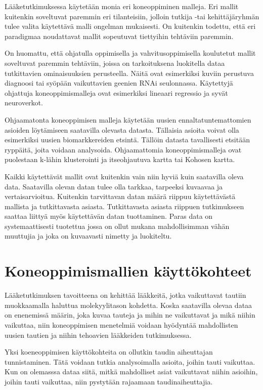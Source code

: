 \documentclass[finnish,twoside,censored,essay,sw-line]{HYthesisML}
\begin{document}
Lääketutkimuksessa käytetään monia eri koneoppiminen malleja. Eri mallit kuitenkin soveltuvat paremmin eri tilanteisiin,
jolloin tutkija -tai kehittäjäryhmän tulee valita käytettävä malli ongelman mukaisesti. On kuitenkin todettu, että
eri paradigmaa noudattavat mallit sopeutuvat tiettyihin tehtäviin paremmin.

On huomattu, että ohjatulla oppimisella
ja vahvitusoppimisella koulutetut mallit soveltuvat paremmin tehtäviin, joissa on tarkoituksena luokitella
dataa tutkittavien ominaisuuksien perusteella. Näitä ovat esimerkiksi kuviin perustuva diagnoosi tai syöpään
vaikuttavien geenien RNAi seulonnassa. Käytettyjä ohjattuja koneoppimismalleja ovat esimerkiksi lineaari regressio
ja syvät neuroverkot.

Ohjaamatonta koneoppimisen malleja käytetään uusien ennaltatuntemattomien asioiden löytämiseen saatavilla olevasta datasta.
Tällaisia asioita voivat olla esimerkiksi uusien biomarkkereiden etsintä. Tällöin datasta tavallisesti etsitään ryppäitä, joita
voidaan analysoida. Ohjaamattomia koneoppimismalleja ovat puolestaan k-lähin klusterointi ja itseohjautuva kartta
tai Kohosen kartta.

Kaikki käytettävät mallit ovat kuitenkin vain niin hyviä kuin saatavilla oleva data. Saatavilla olevan datan
tulee olla tarkkaa, tarpeeksi kuvaavaa ja vertaisarvioitua. Kuitenkin tarvittavan datan määrä riippuu käytettävästä
mallista ja tutkittavasta asiasta. Tutkittavasta asiasta riippuen tutkimukseen saattaa liittyä myös käytettävän datan
tuottaminen. Paras data on systemaattisesti tuotettua jossa on ollut mukana mahdollisimman vähän muuttujia
ja joka on kuvaavasti nimetty ja luokiteltu.

\chapter{Koneoppimismallien käyttökohteet}

Lääketutkimuksen tavoitteena on kehittää lääkkeitä, jotka vaikuttavat tautiin muokkaamalla haluttua molekyylitason kohdetta.
Koska saatavilla olevaa dataa on enenemissä määrin, joka kuvaa tauteja ja mihin ne vaikuttavat ja mikä niihin
vaikuttaa, niin koneoppimisen menetelmiä voidaan hyödyntää mahdollisten uusien tautien ja niihin tehoavien lääkkeiden
tutkimuksessa.

Yksi koeneoppimisen käyttökohteita on ollutkin taudin aiheuttajan tunnistaminen. Tätä voidaan tutkia
analysoimalla asioita, joihin tauti vaikuttaa. Kun on olemasssa dataa siitä, mitkä mahdolliset asiat vaikuttavat
niihin asioihin, joihin tauti vaikuttaa, niin pystytään rajaamaan taudinaiheuttajia.
\end{document}

